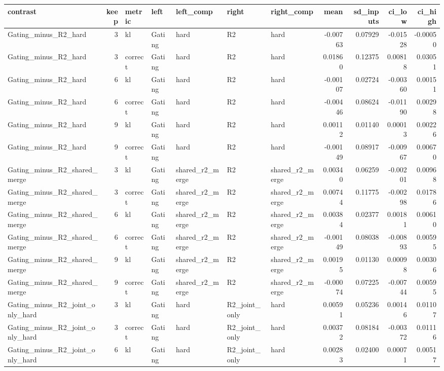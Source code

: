 \begin{tabular}{lrlllllrrrr}
\toprule
contrast & keep & metric & left & left_comp & right & right_comp & mean & sd_inputs & ci_low & ci_high \\
\midrule
Gating_minus_R2_hard & 3 & kl & Gating & hard & R2 & hard & -0.00763 & 0.07929 & -0.01528 & -0.00050 \\
Gating_minus_R2_hard & 3 & correct & Gating & hard & R2 & hard & 0.01860 & 0.12375 & 0.00818 & 0.03051 \\
Gating_minus_R2_hard & 6 & kl & Gating & hard & R2 & hard & -0.00107 & 0.02724 & -0.00360 & 0.00151 \\
Gating_minus_R2_hard & 6 & correct & Gating & hard & R2 & hard & -0.00446 & 0.08624 & -0.01190 & 0.00298 \\
Gating_minus_R2_hard & 9 & kl & Gating & hard & R2 & hard & 0.00112 & 0.01140 & 0.00013 & 0.00226 \\
Gating_minus_R2_hard & 9 & correct & Gating & hard & R2 & hard & -0.00149 & 0.08917 & -0.00967 & 0.00670 \\
Gating_minus_R2_shared_merge & 3 & kl & Gating & shared_r2_merge & R2 & shared_r2_merge & 0.00340 & 0.06259 & -0.00201 & 0.00968 \\
Gating_minus_R2_shared_merge & 3 & correct & Gating & shared_r2_merge & R2 & shared_r2_merge & 0.00744 & 0.11775 & -0.00298 & 0.01786 \\
Gating_minus_R2_shared_merge & 6 & kl & Gating & shared_r2_merge & R2 & shared_r2_merge & 0.00384 & 0.02377 & 0.00181 & 0.00610 \\
Gating_minus_R2_shared_merge & 6 & correct & Gating & shared_r2_merge & R2 & shared_r2_merge & -0.00149 & 0.08038 & -0.00893 & 0.00595 \\
Gating_minus_R2_shared_merge & 9 & kl & Gating & shared_r2_merge & R2 & shared_r2_merge & 0.00195 & 0.01130 & 0.00098 & 0.00306 \\
Gating_minus_R2_shared_merge & 9 & correct & Gating & shared_r2_merge & R2 & shared_r2_merge & -0.00074 & 0.07225 & -0.00744 & 0.00595 \\
Gating_minus_R2_joint_only_hard & 3 & kl & Gating & hard & R2_joint_only & hard & 0.00591 & 0.05236 & 0.00146 & 0.01107 \\
Gating_minus_R2_joint_only_hard & 3 & correct & Gating & hard & R2_joint_only & hard & 0.00372 & 0.08184 & -0.00372 & 0.01116 \\
Gating_minus_R2_joint_only_hard & 6 & kl & Gating & hard & R2_joint_only & hard & 0.00283 & 0.02400 & 0.00071 & 0.00517 \\

\end{tabular}
